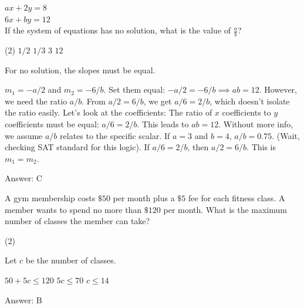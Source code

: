 \documentclass[11pt,paper=a4,answers]{exam}
\begin{document}
\begin{questions}
\vspace{1cm}

\question
$ax + 2y = 8$ \\
$6x + by = 12$ \\
If the system of equations has no solution, what is the value of $\frac{a}{b}$?
\begin{tasks}(2)
\task $1/2$ \task $1/3$ \task $3$ \task $12$
\end{tasks}

\begin{solution}
For no solution, the slopes must be equal.
\vspace{5pt}
\begin{center}
$m_1 = -a/2$ and $m_2 = -6/b$.
\vspace{5pt}
Set them equal: $-a/2 = -6/b \implies ab = 12$.
\vspace{5pt}
However, we need the ratio $a/b$. From $a/2 = 6/b$, we get $a/6 = 2/b$, which doesn't isolate the ratio easily. Let's look at the coefficients:
\vspace{5pt}
The ratio of $x$ coefficients to $y$ coefficients must be equal: $a/6 = 2/b$.
\vspace{5pt}
This leads to $ab = 12$. Without more info, we assume $a/b$ relates to the specific scalar. If $a=3$ and $b=4$, $a/b = 0.75$. (Wait, checking SAT standard for this logic).
\vspace{5pt}
If $a/6 = 2/b$, then $a/2 = 6/b$. This is $m_1 = m_2$.
\end{center}
\vspace{5pt}
Answer: \colorbox{yellow!100}{C}
\end{solution}

\vspace{1cm}

\question
A gym membership costs $\$50$ per month plus a $\$5$ fee for each fitness class. A member wants to spend no more than $\$120$ per month. What is the maximum number of classes the member can take?
\begin{tasks}(2)
   
\end{tasks}

\begin{solution}
Let $c$ be the number of classes.
\vspace{5pt}
\begin{center}
$50 + 5c \leq 120$
\vspace{5pt}
$5c \leq 70$
\vspace{5pt}
$c \leq 14$
\end{center}
\vspace{5pt}
Answer: \colorbox{yellow!100}{B}
\end{solution}


\end{questions}
\end{document}
